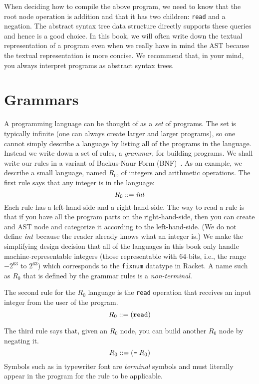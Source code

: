 \documentclass[11pt]{book}
\begin{document}
When deciding how to compile the above program, we need to know that
the root node operation is addition and that it has two children:
\texttt{read} and a negation. The abstract syntax tree data structure
directly supports these queries and hence is a good choice. In this
book, we will often write down the textual representation of a program
even when we really have in mind the AST because the textual
representation is more concise.  We recommend that, in your mind, you
always interpret programs as abstract syntax trees.

\section{Grammars}
\label{sec:grammar}

A programming language can be thought of as a \emph{set} of programs.
The set is typically infinite (one can always create larger and larger
programs), so one cannot simply describe a language by listing all of
the programs in the language. Instead we write down a set of rules, a
\emph{grammar}, for building programs. We shall write our rules in a
variant of Backus-Naur Form (BNF)~\citep{Backus:1960aa,Knuth:1964aa}.
As an example, we describe a small language, named $R_0$, of
integers and arithmetic operations. The first rule says that any
integer is in the language:
\begin{equation}
R_0 ::= \mathit{int}  \label{eq:arith-int}
\end{equation}
Each rule has a left-hand-side and a right-hand-side. The way to read
a rule is that if you have all the program parts on the
right-hand-side, then you can create and AST node and categorize it
according to the left-hand-side. (We do not define $\mathit{int}$ because the
reader already knows what an integer is.) We make the simplifying
design decision that all of the languages in this book only handle
machine-representable integers (those representable with 64-bits,
i.e., the range $-2^{63}$ to $2^{63}$) which corresponds to the
\texttt{fixnum} datatype in Racket. A name such as $R_0$ that is
defined by the grammar rules is a \emph{non-terminal}.

The second rule for the $R_0$ language is the \texttt{read}
operation that receives an input integer from the user of the program.
\begin{equation}
  R_0 ::= (\texttt{read}) \label{eq:arith-read}
\end{equation}

The third rule says that, given an $R_0$ node, you can build another
$R_0$ node by negating it.
\begin{equation}
  R_0 ::= (\texttt{-} \; R_0)  \label{eq:arith-neg}
\end{equation}
Symbols such as \key{-} in typewriter font are \emph{terminal} symbols
and must literally appear in the program for the rule to be
applicable.
\end{document}
